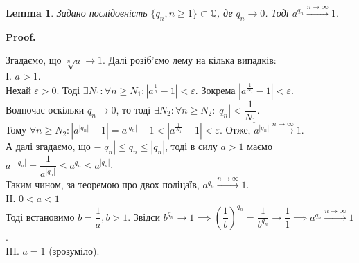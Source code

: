 \documentclass[a4paper, 14pt]{article}
\makeatletter
\def\qed{$\blacksquare$}
\theoremstyle{theoremdd}
\theoremstyle{theoremdd}
\theoremstyle{theoremdd}
\theoremstyle{theoremdd}
\theoremstyle{theoremdd}
\theoremstyle{theoremdd}
\theoremstyle{theoremdd}
\newtheorem{lemma}[theorem]{Lemma}
\theoremstyle{theoremdd}
\renewenvironment{proof}[1][Proof.\\]{\par
\pushQED{\hfill \qed}%
\normalfont \topsep6\p@\@plus6\p@\relax
\trivlist
\item\relax
{\bfseries
#1\@addpunct{.}}\hspace\labelsep\ignorespaces
}{%
\popQED\endtrivlist\@endpefalse
}
\makeatother
\begin{document}
\begin{lemma}
Задано послідовність $\{q_n, n \geq 1\} \subset \mathbb{Q}$, де $q_n \to 0$. Тоді $a^{q_n} \xrightarrow{n \to \infty} 1$.
\end{lemma}

\begin{proof}
Згадаємо, що $\sqrt[n]{a} \to 1$. Далі розіб'ємо лему на кілька випадків:\\
I. $a > 1$.\\
Нехай $\varepsilon > 0$. Тоді $\exists N_1: \forall n \geq N_1: |a^{\frac{1}{n}} - 1| < \varepsilon$. Зокрема $|a^{\frac{1}{N_1}}-1|<\varepsilon$.\\
Водночас оскільки $q_n \to 0$, то тоді $\exists N_2: \forall n \geq N_2: |q_n| < \dfrac{1}{N_1}$.\\
Тому $\forall n \geq N_2: |a^{|q_n|}-1| = a^{|q_n|} - 1 < |a^{\frac{1}{N_1}} - 1| < \varepsilon$. Отже, $a^{|q_n|} \overset{n \to \infty}{\longrightarrow} 1$.\\
А далі згадаємо, що $-|q_n| \leq q_n \leq |q_n|$, тоді в силу $a > 1$ маємо $a^{-|q_n|} = \dfrac{1}{a^{|q_n|}} \leq a^{q_n} \leq a^{|q_n|}$.\\
Таким чином, за теоремою про двох поліцаїв, $a^{q_n} \overset{n \to \infty}{\longrightarrow} 1$.
\bigskip \\
II. $0 < a < 1$\\
Тоді встановимо $b = \dfrac{1}{a}, b > 1$. Звідси $b^{q_n} \to 1 \implies \left(\dfrac{1}{b} \right)^{q_n} = \dfrac{1}{b^{q_n}} \to \dfrac{1}{1} \implies a^{q_n} \xrightarrow{n \to \infty} 1$.
\bigskip \\
III. $a = 1$ (зрозуміло).
\end{proof}

\end{document}
